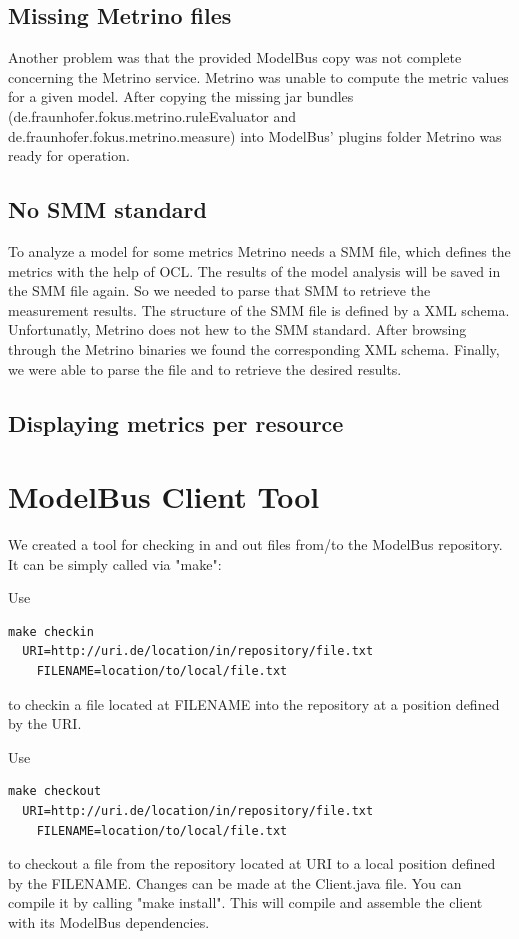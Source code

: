 \subsection{Missing Metrino files}
Another problem was that the provided ModelBus copy was not complete concerning the Metrino service. Metrino was unable to compute the metric values for a given model. After copying the missing jar bundles (de.fraunhofer.fokus.metrino.ruleEvaluator and de.fraunhofer.fokus.metrino.measure) into ModelBus' plugins folder Metrino was ready for operation.

\subsection{No SMM standard}
To analyze a model for some metrics Metrino needs a SMM file, which defines the metrics with the help of OCL. The results of the model analysis will be saved in the SMM file again. So we needed to parse that SMM to retrieve the measurement results. The structure of the SMM file is defined by a XML schema. Unfortunatly, Metrino does not hew to the SMM standard. After browsing through the Metrino binaries we found the corresponding XML schema. Finally, we were able to parse the file and to retrieve the desired results.

\subsection{Displaying metrics per resource}









\section{ModelBus Client Tool}
We created a tool for checking in and out files from/to the ModelBus repository. It can be simply called via "make":

Use
\begin{verbatim}
make checkin 
  URI=http://uri.de/location/in/repository/file.txt 
	FILENAME=location/to/local/file.txt
\end{verbatim}
to checkin a file located at FILENAME into the repository at a position defined by the URI.

Use
\begin{verbatim}
make checkout 
  URI=http://uri.de/location/in/repository/file.txt 
	FILENAME=location/to/local/file.txt
\end{verbatim}
to checkout a file from the repository located at URI to a local position defined by the FILENAME.
Changes can be made at the Client.java file. You can compile it by calling "make install". This will compile and assemble the client with its ModelBus dependencies.